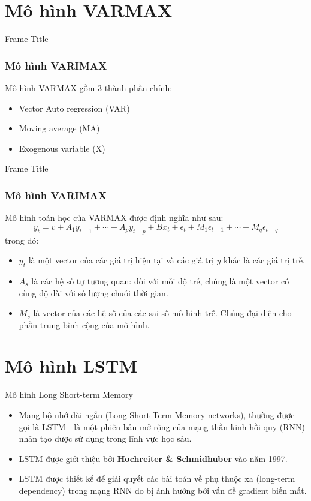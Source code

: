 \documentclass[notheorems,hyperref={bookmarks=true}]{beamer}
\theoremstyle{plain}
\numberwithin{equation}{section}
\begin{document}
\begin{footnotesize}
    \section{Mô hình VARMAX}       
    \begin{frame}{Frame Title}
	\frametitle{Mô hình VARIMAX}
    Mô hình VARMAX gồm 3 thành phần chính:
    \begin{itemize}
		\item Vector Auto regression (VAR)
		\item Moving average (MA)
		\item Exogenous variable (X) 
		\end{itemize}
    \end{frame}
    
    \begin{frame}{Frame Title}
	\frametitle{Mô hình VARIMAX}
   Mô hình toán học của VARMAX được định nghĩa như sau:
\begin{equation}
    y_t = v + A_1y_{t-1} + \cdots + A_py_{t-p} + Bx_t + \epsilon_t + M_1\epsilon_{t-1} + \cdots + M_q\epsilon_{t-q}
\end{equation}
trong đó: 
\begin{itemize}
    \item \textbf{$y_t$} là một vector của các giá trị hiện tại và các giá trị $y$ khác là các giá trị trễ.
    \item \textbf{$A_s$} là các hệ số tự tương quan: đối với mỗi độ trễ, chúng là một vector có cùng độ dài với số lượng chuỗi thời gian.
    \item \textbf{$M_s$} là vector của các hệ số của các sai số mô hình trễ. Chúng đại diện cho phần trung bình cộng của mô hình.
\end{itemize}
    \end{frame}
   
    \section{Mô hình LSTM}
    \begin{frame}{Mô hình Long Short-term Memory}
    \begin{itemize}
        \item Mạng bộ nhớ dài-ngắn (Long Short Term Memory networks), thường được gọi là LSTM - là một phiên bản mở rộng của mạng thần kinh hồi quy (RNN) nhân tạo được sử dụng trong lĩnh vực học sâu.
        \item LSTM được giới thiệu bởi \textbf{Hochreiter \& Schmidhuber}  vào năm 1997.
        \item LSTM được thiết kế để giải quyết các bài toán về phụ thuộc xa (long-term dependency) trong mạng RNN do bị ảnh hưởng bởi vấn đề gradient biến mất.
    \end{itemize}  
    \end{frame}


\end{footnotesize}
\end{document}
